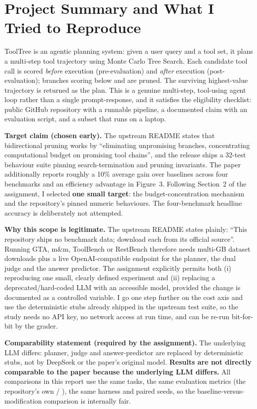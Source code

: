 \documentclass[11pt,letterpaper]{article}
\newcommand{\code}[1]{\texttt{\detokenize{#1}}}
\begin{document}
\section{Project Summary and What I Tried to Reproduce}

ToolTree is an agentic planning system: given a user query and a tool set, it plans
a multi-step tool trajectory using Monte Carlo Tree Search. Each candidate tool
call is scored \emph{before} execution (pre-evaluation) and \emph{after} execution
(post-evaluation); branches scoring below \code{tau_pre} and \code{tau_post} are
pruned. The surviving highest-value trajectory is returned as the plan. This is a
genuine multi-step, tool-using agent loop rather than a single prompt-response,
and it satisfies the eligibility checklist: public GitHub repository with a
runnable pipeline, a documented claim with an evaluation script, and a subset that
runs on a laptop.

\textbf{Target claim (chosen early).} The upstream README states that bidirectional
pruning works by ``eliminating unpromising branches, concentrating computational
budget on promising tool chains'', and the release ships a 32-test behaviour suite
pinning search-termination and pruning invariants. The paper additionally reports
roughly a 10\% average gain over baselines across four benchmarks and an efficiency
advantage in Figure~3. Following Section~2 of the assignment, I selected
\textbf{one small target}: the budget-concentration mechanism and the repository's
pinned numeric behaviours. The four-benchmark headline accuracy is deliberately
not attempted.

\textbf{Why this scope is legitimate.} The upstream README states plainly: ``This
repository ships no benchmark data; download each from its official source''.
Running GTA, m\&m, ToolBench or RestBench therefore needs multi-GB dataset
downloads plus a live OpenAI-compatible endpoint for the planner, the dual judge
and the answer predictor. The assignment explicitly permits both (i) reproducing
one small, clearly defined experiment and (ii) replacing a deprecated/hard-coded
LLM with an accessible model, provided the change is documented as a controlled
variable. I go one step further on the cost axis and use the deterministic stubs
already shipped in the upstream test suite, so the study needs no API key, no
network access at run time, and can be re-run bit-for-bit by the grader.

\textbf{Comparability statement (required by the assignment).} The underlying LLM
differs: planner, judge and answer-predictor are replaced by deterministic stubs,
not by DeepSeek or the paper's original model. \textbf{Results are not directly
comparable to the paper because the underlying LLM differs.} All comparisons in
this report use the same tasks, the same evaluation metrics (the repository's own
\code{tool_f1} / \code{plan_f1}), the same harness and paired seeds, so the
baseline-versus-modification comparison is internally fair.
\end{document}
